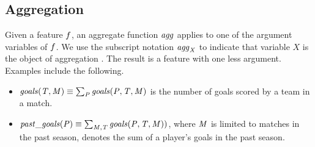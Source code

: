 \documentclass[conference]{IEEEtran}
\newcommand{\team}{T}
\newcommand{\player}{P}
\newcommand{\match}{M}
\newcommand{\plusminus}{\mbox{+/-}}
\newcommand{\aggregate}{\it{agg}}
\begin{document}
\subsection{Aggregation} Given a feature $f$, an aggregate function $\aggregate$ applies to one of the argument variables of $f$. We use the subscript notation $\aggregate_{X}$ to indicate that variable $X$ is the object of aggregation \cite{Popescul2007}. The result is a feature with one less argument. Examples include the following.

\begin{itemize}
\item $\it{goals}(\team,\match) \equiv \sum_{\player} \it{goals}(\player,\team,\match)$ is the number of goals scored by a team in a match.
\item $\it{past}\_\it{goals}(\player) \equiv \sum_{\match,\team %
} \it{goals}(\player,\team,\match))$, where $\it{M}$ is limited to matches in the past season, denotes the sum of a player's goals in the past season.
\end{itemize}


%
\end{document}
